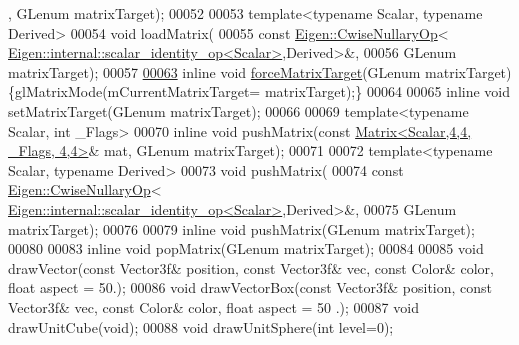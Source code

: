 \begin{DoxyCode}
      , GLenum matrixTarget);
00052 
00053     \textcolor{keyword}{template}<\textcolor{keyword}{typename} Scalar, \textcolor{keyword}{typename} Derived>
00054     \textcolor{keywordtype}{void} loadMatrix(
00055         \textcolor{keyword}{const} \hyperlink{group___core___module_class_eigen_1_1_cwise_nullary_op}{Eigen::CwiseNullaryOp}<
      \hyperlink{struct_eigen_1_1internal_1_1scalar__identity__op}{Eigen::internal::scalar\_identity\_op<Scalar>},Derived>&,
00056         GLenum matrixTarget);
00057 
\hyperlink{class_gpu_helper_a52a9ab12d07acbf4ad80737595a9b06e}{00063}     \textcolor{keyword}{inline} \textcolor{keywordtype}{void} \hyperlink{class_gpu_helper_a52a9ab12d07acbf4ad80737595a9b06e}{forceMatrixTarget}(GLenum matrixTarget) \{glMatrixMode(mCurrentMatrixTarget=
      matrixTarget);\}
00064 
00065     \textcolor{keyword}{inline} \textcolor{keywordtype}{void} setMatrixTarget(GLenum matrixTarget);
00066 
00069     \textcolor{keyword}{template}<\textcolor{keyword}{typename} Scalar, \textcolor{keywordtype}{int} \_Flags>
00070     \textcolor{keyword}{inline} \textcolor{keywordtype}{void} pushMatrix(\textcolor{keyword}{const} \hyperlink{group___core___module_class_eigen_1_1_matrix}{Matrix<Scalar,4,4, \_Flags, 4,4>}& mat, 
      GLenum matrixTarget);
00071 
00072     \textcolor{keyword}{template}<\textcolor{keyword}{typename} Scalar, \textcolor{keyword}{typename} Derived>
00073     \textcolor{keywordtype}{void} pushMatrix(
00074         \textcolor{keyword}{const} \hyperlink{group___core___module_class_eigen_1_1_cwise_nullary_op}{Eigen::CwiseNullaryOp}<
      \hyperlink{struct_eigen_1_1internal_1_1scalar__identity__op}{Eigen::internal::scalar\_identity\_op<Scalar>},Derived>&,
00075         GLenum matrixTarget);
00076 
00079     \textcolor{keyword}{inline} \textcolor{keywordtype}{void} pushMatrix(GLenum matrixTarget);
00080 
00083     \textcolor{keyword}{inline} \textcolor{keywordtype}{void} popMatrix(GLenum matrixTarget);
00084 
00085     \textcolor{keywordtype}{void} drawVector(\textcolor{keyword}{const} Vector3f& position, \textcolor{keyword}{const} Vector3f& vec, \textcolor{keyword}{const} Color& color, \textcolor{keywordtype}{float} aspect = 50.);
00086     \textcolor{keywordtype}{void} drawVectorBox(\textcolor{keyword}{const} Vector3f& position, \textcolor{keyword}{const} Vector3f& vec, \textcolor{keyword}{const} Color& color, \textcolor{keywordtype}{float} aspect = 50
      .);
00087     \textcolor{keywordtype}{void} drawUnitCube(\textcolor{keywordtype}{void});
00088     \textcolor{keywordtype}{void} drawUnitSphere(\textcolor{keywordtype}{int} level=0);

\end{DoxyCode}
